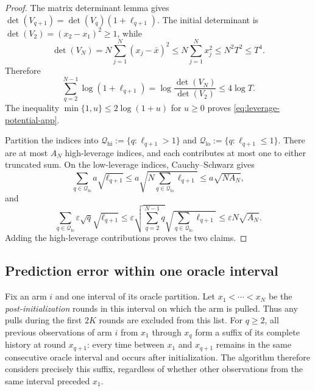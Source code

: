 \documentclass[11pt]{article}
\theoremstyle{remark}
\begin{document}
\begin{proof}
The matrix determinant lemma gives
$\det(V_{q+1})=\det(V_q)(1+\ell_{q+1})$. The initial determinant is
$\det(V_2)=(x_2-x_1)^2\ge1$, while
\[
\det(V_N)
=N\sum_{j=1}^N(x_j-\bar x)^2
\le N\sum_{j=1}^Nx_j^2
\le N^2T^2\le T^4.
\]
Therefore
\[
\sum_{q=2}^{N-1}\log(1+\ell_{q+1})
=\log\frac{\det(V_N)}{\det(V_2)}
\le4\log T.
\]
The inequality $\min\{1,u\}\le2\log(1+u)$ for $u\ge0$ proves
\eqref{eq:leverage-potential-app}.

Partition the indices into
$\mathcal Q_{\mathrm{hi}}:=\{q:\ell_{q+1}>1\}$ and
$\mathcal Q_{\mathrm{lo}}:=\{q:\ell_{q+1}\le1\}$. There are at most $A_N$
high-leverage indices, and each contributes at most one to either truncated
sum. On the low-leverage indices, Cauchy--Schwarz gives
\[
\sum_{q\in\mathcal Q_{\mathrm{lo}}}a\sqrt{\ell_{q+1}}
\le a\sqrt{N\sum_{q\in\mathcal Q_{\mathrm{lo}}}\ell_{q+1}}
\le a\sqrt{NA_N},
\]
and
\[
\sum_{q\in\mathcal Q_{\mathrm{lo}}}
\varepsilon\sqrt q\sqrt{\ell_{q+1}}
\le\varepsilon\sqrt{\sum_{q=2}^{N-1}q}
\sqrt{\sum_{q\in\mathcal Q_{\mathrm{lo}}}\ell_{q+1}}
\le\varepsilon N\sqrt{A_N}.
\]
Adding the high-leverage contributions proves the two claims.
\end{proof}

\subsection{Prediction error within one oracle interval}

Fix an arm $i$ and one interval of its oracle partition. Let
$x_1<\cdots<x_N$ be the \emph{post-initialization} rounds in this interval on
which the arm is pulled. Thus any pulls during the first $2K$ rounds are
excluded from this list. For $q\ge2$, all previous observations of arm $i$
from $x_1$ through $x_q$ form a suffix of its complete history at round
$x_{q+1}$: every time between $x_1$ and $x_{q+1}$ remains in the same
consecutive oracle interval and occurs after initialization. The algorithm
therefore considers precisely this suffix, regardless of whether other
observations from the same interval preceded $x_1$.
\end{document}
